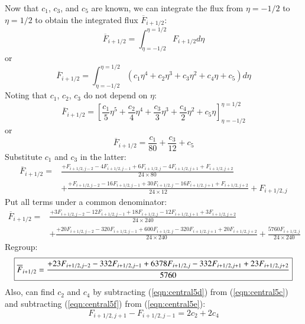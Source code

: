 \documentclass{warpdoc}
\newcommand\frameeqn[1]{\fbox{$\displaystyle #1$}}
\begin{document}
Now that $c_1$, $c_3$, and $c_5$ are known, we can integrate the flux from $\eta=-1/2$ to $\eta=1/2$ to obtain the integrated flux $\overline{F}_{i+1/2}$:
%
\begin{equation}
\overline{F}_{i+1/2}=\int_{\eta=-1/2}^{\eta=1/2} F_{i+1/2} d\eta
\end{equation}
%
or
%
\begin{equation}
\overline{F}_{i+1/2}=\int_{\eta=-1/2}^{\eta=1/2} \left( c_1 \eta^4 + c_2 \eta^3 + c_3 \eta^2 + c_4 \eta + c_5 \right) d\eta
\end{equation}
%
Noting that $c_1$, $c_2$, $c_3$ do not depend on $\eta$:
%
\begin{equation}
\overline{F}_{i+1/2}= \left[ \frac{c_1}{5} \eta^5 + \frac{c_2}{4} \eta^4 + \frac{c_3}{3} \eta^3 + \frac{c_4}{2} \eta^2 + c_5 \eta \right]_{\eta=-1/2}^{\eta=1/2}
\end{equation}
%
or
%
\begin{equation}
\overline{F}_{i+1/2}=  \frac{c_1}{80}  + \frac{c_3}{12}   + c_5  
\end{equation}
%
Substitute $c_1$ and $c_3$ in the latter:
%
\begin{align}
\overline{F}_{i+1/2}= & \frac{+F_{i+1/2,j-2} -4 F_{i+1/2,j-1}+ 6 F_{i+1/2,j} -4 F_{i+1/2,j+1} +F_{i+1/2,j+2}}{24\times 80}\nonumber\\
 &+ \frac{+ F_{i+1/2,j-2} -16 F_{i+1/2,j-1}+ 30 F_{i+1/2,j} -16 F_{i+1/2,j+1} +F_{i+1/2,j+2}}{24\times 12}  
 + F_{i+1/2,j} 
\end{align}
%
Put all terms under a common denominator:
%
\begin{align}
\overline{F}_{i+1/2}= & \frac{+3 F_{i+1/2,j-2} -12 F_{i+1/2,j-1}+ 18 F_{i+1/2,j} - 12 F_{i+1/2,j+1} +3F_{i+1/2,j+2}}{24\times 240}\nonumber\\
 &+ \frac{+ 20 F_{i+1/2,j-2} -320 F_{i+1/2,j-1}+ 600 F_{i+1/2,j} -320 F_{i+1/2,j+1} +20 F_{i+1/2,j+2}}{24\times 240}  
 + \frac{ 5760 F_{i+1/2,j}}{24\times 240} 
\end{align}
%
Regroup:
%
\begin{equation}
\frameeqn{
\overline{F}_{i+1/2}=  \frac{+23 F_{i+1/2,j-2} -332 F_{i+1/2,j-1}+ 6378 F_{i+1/2,j} - 332 F_{i+1/2,j+1} + 23 F_{i+1/2,j+2}}{5760}
}
\label{eqn:Finteg_central5}
\end{equation}
%
Also, can find $c_2$ and $c_4$ by subtracting (\ref{eqn:central5d}) from (\ref{eqn:central5c}) and subtracting (\ref{eqn:central5f}) from (\ref{eqn:central5e}):
%
\begin{equation}
F_{i+1/2,j+1}-F_{i+1/2,j-1}=2 c_2    + 2 c_4   
\label{eqn:central5k}
\end{equation}
\end{document}
